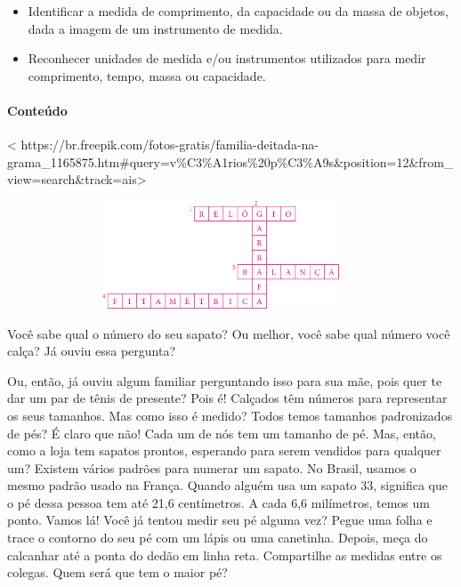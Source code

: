 \begin{itemize}
\item
  Identificar a medida de comprimento, da capacidade ou da massa de
  objetos, dada a imagem de um instrumento de medida.
\end{itemize}

\begin{itemize}
\item
  Reconhecer unidades de medida e/ou instrumentos utilizados para medir
  comprimento, tempo, massa ou capacidade.
\end{itemize}

\paragraph{Conteúdo}\label{conteuxfado-2}

\textless{}
https://br.freepik.com/fotos-gratis/familia-deitada-na-grama\_1165875.htm\#query=v\%C3\%A1rios\%20p\%C3\%A9s\&position=12\&from\_view=search\&track=ais\textgreater{}

\includegraphics[width=5.00000in,height=1.26043in]{media/image39.png}

Você sabe qual o número do seu sapato? Ou melhor, você sabe qual número você calça? Já ouviu essa pergunta?

Ou, então, já ouviu algum familiar perguntando isso para sua mãe, pois
quer te dar um par de tênis de presente? Pois é! Calçados têm números para
representar os seus tamanhos. Mas como isso é medido? Todos temos
tamanhos padronizados de pés? É claro que não! Cada um de nós tem um
tamanho de pé. Mas, então, como a loja tem sapatos prontos, esperando
para serem vendidos para qualquer um? Existem vários padrões para numerar
um sapato. No Brasil, usamos o mesmo padrão usado na França. Quando
alguém usa um sapato 33, significa que o pé dessa pessoa tem até 21,6
centímetros. A cada 6,6 milímetros, temos um ponto. Vamos lá! Você já
tentou medir seu pé alguma vez? Pegue uma folha e trace o contorno do
seu pé com um lápis ou uma canetinha. Depois, meça do calcanhar até a
ponta do dedão em linha reta. Compartilhe as medidas entre os colegas.
Quem será que tem o maior pé? 

